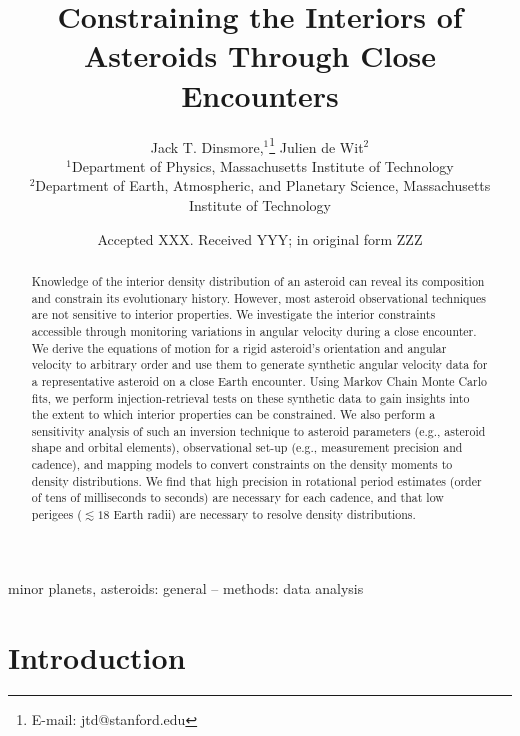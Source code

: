 \documentclass[fleqn,usenatbib]{mnras}
\title[Flyby Constraints on Asteroids Interiors]{Constraining the Interiors of Asteroids Through Close Encounters}
\author[Jack T. Dinsmore, Julien de Wit]{
Jack T. Dinsmore,$^{1}$\thanks{E-mail: jtd@stanford.edu}
Julien de Wit$^{2}$
\\
$^{1}$Department of Physics, Massachusetts Institute of Technology\\
$^{2}$Department of Earth, Atmospheric, and Planetary Science, Massachusetts Institute of Technology
}
\date{Accepted XXX. Received YYY; in original form ZZZ}
\begin{document}
\label{firstpage}
\pagerange{\pageref{firstpage}--\pageref{lastpage}}
\maketitle

\begin{abstract}
  Knowledge of the interior density distribution of an asteroid can reveal its composition and constrain its evolutionary history. However, most asteroid observational techniques are not sensitive to interior properties. We investigate the interior constraints accessible through monitoring variations in angular velocity during a close encounter. We derive the equations of motion for a rigid asteroid's orientation and angular velocity to arbitrary order and use them to generate synthetic angular velocity data for a representative asteroid on a close Earth encounter. Using Markov Chain Monte Carlo fits, we perform injection-retrieval tests on these synthetic data to gain insights into the extent to which interior properties can be constrained. We also perform a sensitivity analysis of such an inversion technique to asteroid parameters (e.g., asteroid shape and orbital elements), observational set-up (e.g., measurement precision and cadence), and mapping models to convert constraints on the density moments to density distributions. We find that high precision in rotational period estimates (order of tens of milliseconds to seconds) are necessary for each cadence, and that low perigees ($\lesssim 18$ Earth radii) are necessary to resolve density distributions.
\end{abstract}

\begin{keywords}
  minor planets, asteroids: general -- methods: data analysis
\end{keywords}



\section{Introduction}
\end{document}
